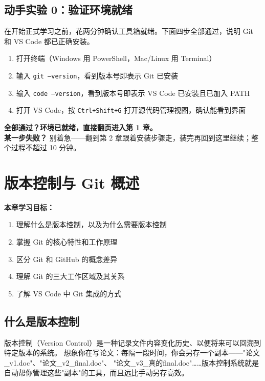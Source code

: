 \documentclass[12pt,a4paper,openany]{ctexbook}
\begin{document}
\section{动手实验 0：验证环境就绪}

在开始正式学习之前，花两分钟确认工具箱就绪。下面四步全部通过，说明 Git 和 VS Code 都已正确安装。
\medskip
\begin{enumerate}[leftmargin=1.5em]
  \item 打开终端（Windows 用 PowerShell，Mac/Linux 用 Terminal）
  \item 输入 \texttt{git --version}，看到版本号即表示 Git 已安装
  \item 输入 \texttt{code --version}，看到版本号即表示 VS Code 已安装且已加入 PATH
  \item 打开 VS Code，按 \texttt{Ctrl+Shift+G} 打开源代码管理视图，确认能看到界面
\end{enumerate}
\medskip

\textbf{全部通过？环境已就绪，直接翻页进入第 1 章。}\\
\textbf{某一步失败？} 别着急——翻到第 2 章跟着安装步骤走，装完再回到这里继续；整个过程不超过 10 分钟。

\clearpage

\chapter{版本控制与 Git 概述}

\medskip
\noindent\textbf{本章学习目标：}
\begin{enumerate}[leftmargin=1.5em]
  \item 理解什么是版本控制，以及为什么需要版本控制
  \item 掌握 Git 的核心特性和工作原理
  \item 区分 Git 和 GitHub 的概念差异
  \item 理解 Git 的三大工作区域及其关系
  \item 了解 VS Code 中 Git 集成的方式
\end{enumerate}
\medskip

\section{什么是版本控制}

版本控制（Version Control）是一种记录文件内容变化历史、以便将来可以回溯到特定版本的系统。
想象你在写论文：每隔一段时间，你会另存一个副本——"论文\_v1.doc"、"论文\_v2\_final.doc"、
"论文\_v3\_真的final.doc"……版本控制系统就是自动帮你管理这些"副本"的工具，而且远比手动另存高效。
\end{document}
